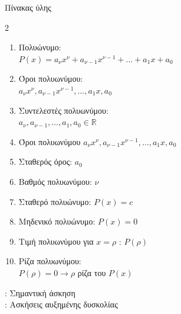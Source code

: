 \documentclass[twoside,nofonts,internet,math,spyros]{frontisthrio}
\newcommand{\eksigisi}{
\begin{flushright}
\vfill
\faEdit: Σημαντική άσκηση\\
\faExclamationTriangle: Ασκήσεις αυξημένης δυσκολίας
\end{flushright}}
\begin{document}
\begin{mybox}[mysubtitle]{Πίνακας ύλης}
\begin{multicols}{2}
\begin{enumerate}[itemsep=0mm,leftmargin=3mm]
\begin{multicols}{2}
\begin{itemize}[leftmargin=4mm]
\item Συντελεστής: $a$
\item Κύριο μέρος: $x^{\nu}$
\end{itemize}
\end{multicols}
όπου $a\in\mathbb{R}$ και $\nu\in\mathbb{N}$.
\item Πολυώνυμο:\\$ P(x)=a_\nu x^\nu+a_{\nu-1}x^{\nu-1}+\ldots+a_1x+a_0 $
\item Όροι πολυωνύμου:\\
$ a_{\nu}x^{\nu},a_{\nu-1}x^{\nu-1},\ldots,a_1x,a_0 $
\item Συντελεστές πολυωνύμου:\\$ a_{\nu},a_{\nu-1},\ldots,a_1,a_0\in\mathbb{R} $
\item Όροι πολυωνύμου $a_{\nu}x^{\nu},a_{\nu-1}x^{\nu-1},\ldots,a_1x,a_0$
\item Σταθερός όρος: $ a_0 $
\item Βαθμός πολυωνύμου: $\nu$
\item Σταθερό πολυώνυμο: $ P(x)=c $
\item Μηδενικό πολυώνυμο: $ P(x)=0 $
\item Τιμή πολυωνύμου για $ x=\rho $ : $ P(\rho) $
\item Ρίζα πολυωνύμου:\\$ P(\rho)=0\rightarrow\rho $ ρίζα του $ P(x) $
\end{enumerate}
\end{multicols}
\end{mybox}
\eksigisi
\newpage
\end{document}
